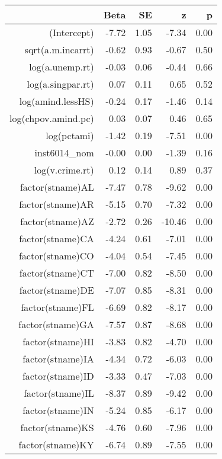 \begin{table}[ht]
\centering
\begin{tabular}{rrrrr}
  \hline
 & Beta & SE & z & p \\ 
  \hline
(Intercept) & -7.72 & 1.05 & -7.34 & 0.00 \\ 
  sqrt(a.m.incarrt) & -0.62 & 0.93 & -0.67 & 0.50 \\ 
  log(a.unemp.rt) & -0.03 & 0.06 & -0.44 & 0.66 \\ 
  log(a.singpar.rt) & 0.07 & 0.11 & 0.65 & 0.52 \\ 
  log(amind.lessHS) & -0.24 & 0.17 & -1.46 & 0.14 \\ 
  log(chpov.amind.pc) & 0.03 & 0.07 & 0.46 & 0.65 \\ 
  log(pctami) & -1.42 & 0.19 & -7.51 & 0.00 \\ 
  inst6014\_nom & -0.00 & 0.00 & -1.39 & 0.16 \\ 
  log(v.crime.rt) & 0.12 & 0.14 & 0.89 & 0.37 \\ 
  factor(stname)AL & -7.47 & 0.78 & -9.62 & 0.00 \\ 
  factor(stname)AR & -5.15 & 0.70 & -7.32 & 0.00 \\ 
  factor(stname)AZ & -2.72 & 0.26 & -10.46 & 0.00 \\ 
  factor(stname)CA & -4.24 & 0.61 & -7.01 & 0.00 \\ 
  factor(stname)CO & -4.04 & 0.54 & -7.45 & 0.00 \\ 
  factor(stname)CT & -7.00 & 0.82 & -8.50 & 0.00 \\ 
  factor(stname)DE & -7.07 & 0.85 & -8.31 & 0.00 \\ 
  factor(stname)FL & -6.69 & 0.82 & -8.17 & 0.00 \\ 
  factor(stname)GA & -7.57 & 0.87 & -8.68 & 0.00 \\ 
  factor(stname)HI & -3.83 & 0.82 & -4.70 & 0.00 \\ 
  factor(stname)IA & -4.34 & 0.72 & -6.03 & 0.00 \\ 
  factor(stname)ID & -3.33 & 0.47 & -7.03 & 0.00 \\ 
  factor(stname)IL & -8.37 & 0.89 & -9.42 & 0.00 \\ 
  factor(stname)IN & -5.24 & 0.85 & -6.17 & 0.00 \\ 
  factor(stname)KS & -4.76 & 0.60 & -7.96 & 0.00 \\ 
  factor(stname)KY & -6.74 & 0.89 & -7.55 & 0.00 \\ 

\end{tabular}
\end{table}
